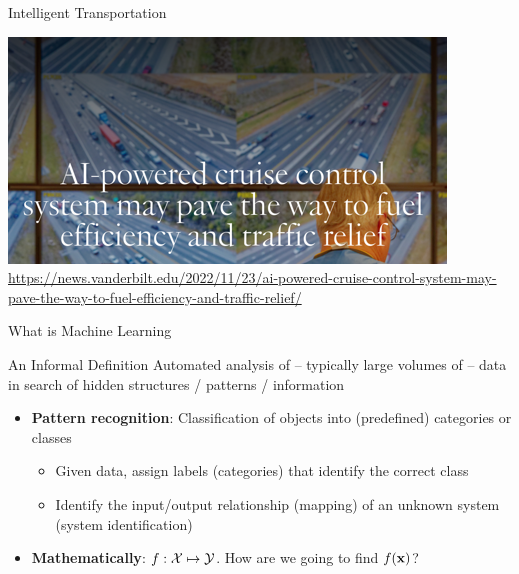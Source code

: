 \documentclass[aspectratio=169,xcolor=dvipsnames,svgnames,x11names,fleqn]{beamer}
\begin{document}

\begin{frame}{Intelligent Transportation}
  \begin{center}
    \includegraphics[width=.5\textwidth]{figures/transportation_AI.png}\\
    {\tiny\color{MediumRed}\url{https://news.vanderbilt.edu/2022/11/23/ai-powered-cruise-control-system-may-pave-the-way-to-fuel-efficiency-and-traffic-relief/}}
  \end{center}
\end{frame}

\begin{frame}{What is Machine Learning}
\begin{tblock}{An Informal Definition}
Automated analysis of – typically large volumes of – data in search of hidden structures / patterns / information
\begin{itemize}
    \item<2-> {\bf\color{DarkBlue} Pattern recognition}: Classification of objects into (predefined) categories or classes 
    \begin{itemize}
        \item Given data, assign labels (categories) that identify the correct class 
        \item Identify the input/output relationship (mapping) of an unknown system (system identification) 
    \end{itemize}
    \item<3-> {\bf\color{DarkBlue} Mathematically}: $f: {\mathcal X} \mapsto {\mathcal Y}$. How are we going to find $f({\mathbf x})$?
\end{itemize}
\end{tblock}
\end{frame}
\end{document}
